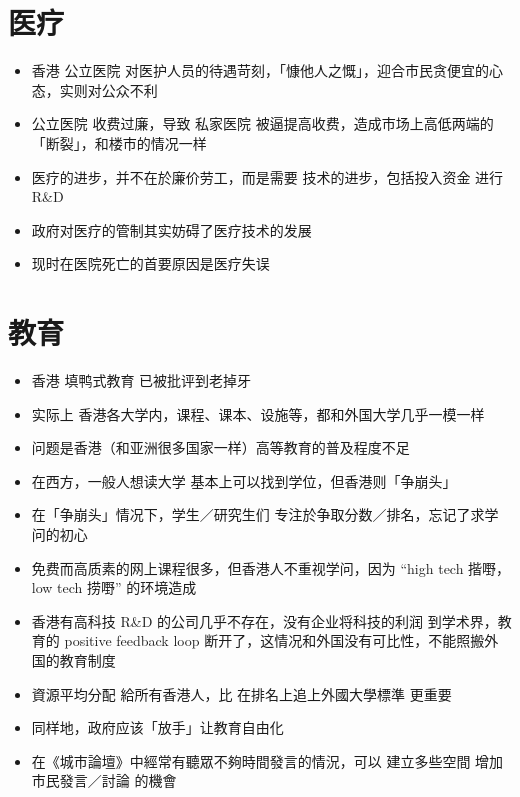 \section{医疗}
\begin{itemize}
	\item 香港 公立医院 对医护人员的待遇苛刻，「慷他人之慨」，迎合市民贪便宜的心态，实则对公众不利
	
	\item 公立医院 收费过廉，导致 私家医院 被逼提高收费，造成市场上高低两端的「断裂」，和楼市的情况一样
	
	\item 医疗的进步，并不在於廉价劳工，而是需要 技术的进步，包括投入资金 进行 R\&D
	
	\item 政府对医疗的管制其实妨碍了医疗技术的发展
	
	\item 现时在医院死亡的首要原因是医疗失误
\end{itemize}



\section{教育}
\begin{itemize}
	\item 香港 填鸭式教育 已被批评到老掉牙
	
	\item 实际上 香港各大学内，课程、课本、设施等，都和外国大学几乎一模一样
	
	\item 问题是香港（和亚洲很多国家一样）高等教育的普及程度不足
	
	\item 在西方，一般人想读大学 基本上可以找到学位，但香港则「争崩头」 
	
	\item 在「争崩头」情况下，学生／研究生们 专注於争取分数／排名，忘记了求学问的初心 
	
	\item 免费而高质素的网上课程很多，但香港人不重视学问，因为 ``high tech 揩嘢，low tech 捞嘢'' 的环境造成
	
	\item 香港有高科技 R\&D 的公司几乎不存在，没有企业将科技的利润  到学术界，教育的 positive feedback loop 断开了，这情况和外国没有可比性，不能照搬外国的教育制度
	
	\item 資源平均分配 給所有香港人，比 在排名上追上外國大學標準 更重要
	
	\item 同样地，政府应该「放手」让教育自由化
	
	\item 在《城市論壇》中經常有聽眾不夠時間發言的情況，可以 建立多些空間 增加市民發言／討論 的機會
\end{itemize}


